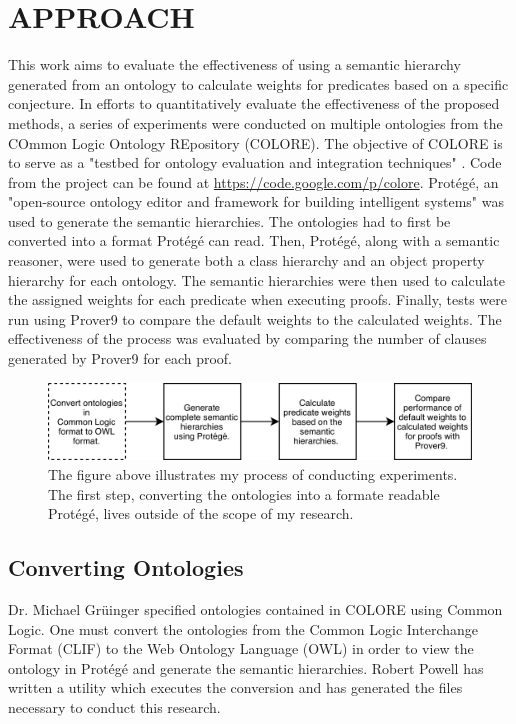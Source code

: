 \documentclass{article}
\begin{document}
\section{\MakeUppercase{Approach}}
This work aims to evaluate the effectiveness of using a semantic hierarchy generated from an ontology to calculate weights for predicates based on a specific conjecture. In efforts to quantitatively evaluate the effectiveness of the proposed methods, a series of experiments were conducted on multiple ontologies from the COmmon Logic Ontology REpository (COLORE). The objective of COLORE is to serve as a "testbed for ontology evaluation and integration techniques" \cite{gruninger2012specifying}. Code from the project can be found at \url{https://code.google.com/p/colore}. Prot{\'e}g{\'e}, an "open-source ontology editor and framework for building intelligent systems" was used to generate the semantic hierarchies. The ontologies had to first be converted into a format Prot{\'e}g{\'e} can read. Then, Prot{\'e}g{\'e}, along with a semantic reasoner, were used to generate both a class hierarchy and an object property hierarchy for each ontology. The semantic hierarchies were then used to calculate the assigned weights for each predicate when executing proofs. Finally, tests were run using Prover9 to compare the default weights to the calculated weights. The effectiveness of the process was evaluated by comparing the number of clauses generated by Prover9 for each proof. 

\begin{figure}[h]
\centering
\includegraphics[width=6in]{flowchart}
\caption{The figure above illustrates my process of conducting experiments. The first step, converting the ontologies into a formate readable Prot{\'e}g{\'e}, lives outside of the scope of my research.}
\label{fig:flowchart}
\end{figure}

\subsection{Converting Ontologies}
Dr. Michael Gr\"{u}inger specified ontologies contained in COLORE using Common Logic. One must convert the ontologies from the Common Logic Interchange Format (CLIF) to the Web Ontology Language (OWL) in order to view the ontology in Prot{\'e}g{\'e} and generate the semantic hierarchies. Robert Powell has written a utility which executes the conversion and has generated the files necessary to conduct this research. 
\end{document}

